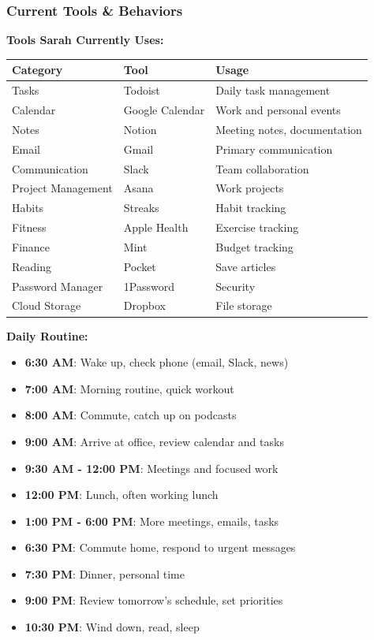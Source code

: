 \subsubsection{Current Tools \& Behaviors}

\textbf{Tools Sarah Currently Uses:}

\begin{table}[H]
\centering
\begin{tabular}{|l|l|p{6cm}|}
\hline
\rowcolor{lightgray}
\textbf{Category} & \textbf{Tool} & \textbf{Usage} \\
\hline
Tasks & Todoist & Daily task management \\
\hline
Calendar & Google Calendar & Work and personal events \\
\hline
Notes & Notion & Meeting notes, documentation \\
\hline
Email & Gmail & Primary communication \\
\hline
Communication & Slack & Team collaboration \\
\hline
Project Management & Asana & Work projects \\
\hline
Habits & Streaks & Habit tracking \\
\hline
Fitness & Apple Health & Exercise tracking \\
\hline
Finance & Mint & Budget tracking \\
\hline
Reading & Pocket & Save articles \\
\hline
Password Manager & 1Password & Security \\
\hline
Cloud Storage & Dropbox & File storage \\
\hline
\end{tabular}
\end{table}

\textbf{Daily Routine:}

\begin{itemize}
    \item \textbf{6:30 AM}: Wake up, check phone (email, Slack, news)
    \item \textbf{7:00 AM}: Morning routine, quick workout
    \item \textbf{8:00 AM}: Commute, catch up on podcasts
    \item \textbf{9:00 AM}: Arrive at office, review calendar and tasks
    \item \textbf{9:30 AM - 12:00 PM}: Meetings and focused work
    \item \textbf{12:00 PM}: Lunch, often working lunch
    \item \textbf{1:00 PM - 6:00 PM}: More meetings, emails, tasks
    \item \textbf{6:30 PM}: Commute home, respond to urgent messages
    \item \textbf{7:30 PM}: Dinner, personal time
    \item \textbf{9:00 PM}: Review tomorrow's schedule, set priorities
    \item \textbf{10:30 PM}: Wind down, read, sleep
\end{itemize}

